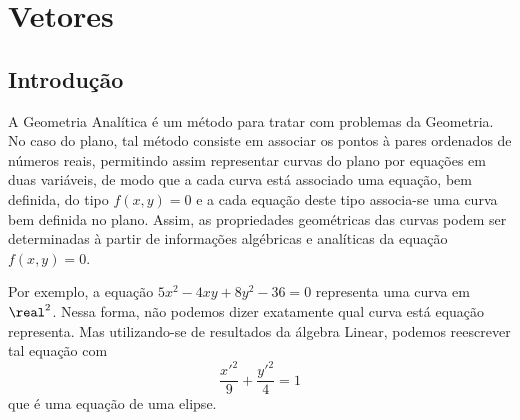 
\chapter{Vetores} %
\label{cha:vetores}

\section{Introdução} %
\label{sec:introducao}

A Geometria Analítica é um método para tratar com problemas da Geometria. No caso do plano, tal método consiste em
associar os pontos à pares ordenados de números reais, permitindo assim representar curvas do plano por equações em duas
variáveis, de modo que a cada curva está associado uma equação, bem definida, do tipo $f(x,y) = 0$ e a cada equação
deste tipo associa-se uma curva bem definida no plano. Assim, as propriedades geométricas das curvas podem ser
determinadas à partir de informações algébricas e analíticas da equação $f(x, y) = 0$.

Por exemplo, a equação $5x^2 - 4xy + 8y^2 - 36 = 0$ representa uma curva em $\real^2$. Nessa forma, não podemos dizer
exatamente qual curva está equação representa. Mas utilizando-se de resultados da álgebra Linear, podemos reescrever tal
equação com
\[
  \dfrac{x'^2}{9} + \dfrac{y'^2}{4} = 1
\]
que é uma equação de uma elipse.




